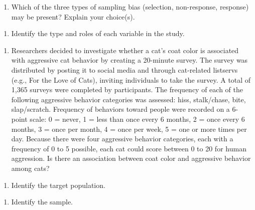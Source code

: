 \documentclass[
]{report}
\providecommand{\tightlist}{%
  \setlength{\itemsep}{0pt}\setlength{\parskip}{0pt}}
\begin{document}
\vspace{0.4in}

\begin{enumerate}
\def\labelenumi{\alph{enumi}.}
\setcounter{enumi}{2}
\tightlist
\item
  Which of the three types of sampling bias (selection, non-response, response) may be present? Explain your choice(s).
\end{enumerate}

\vspace{0.4in}

\begin{enumerate}
\def\labelenumi{\alph{enumi}.}
\setcounter{enumi}{3}
\tightlist
\item
  Identify the type and roles of each variable in the study.
\end{enumerate}

\vspace{0.6in}

\begin{enumerate}
\def\labelenumi{\arabic{enumi}.}
\setcounter{enumi}{3}
\tightlist
\item
  Researchers decided to investigate whether a cat's coat color is associated with aggressive cat behavior by creating a 20-minute survey. The survey was distributed by posting it to social media and through cat-related listservs (e.g., For the Love of Cats), inviting individuals to take the survey. A total of 1,365 surveys were completed by participants. The frequency of each of the following aggressive behavior categories was assessed: hiss, stalk/chase, bite, slap/scratch. Frequency of behaviors toward people were recorded on a 6-point scale: 0 = never, 1 = less than once every 6 months, 2 = once every 6 months, 3 = once per month, 4 = once per week, 5 = one or more times per day. Because there were four aggressive behavior categories, each with a frequency of 0 to 5 possible, each cat could score between 0 to 20 for human aggression. Is there an association between coat color and aggressive behavior among cats?
\end{enumerate}

\begin{enumerate}
\def\labelenumi{\alph{enumi}.}
\tightlist
\item
  Identify the target population.
\end{enumerate}

\vspace{0.4in}

\begin{enumerate}
\def\labelenumi{\alph{enumi}.}
\setcounter{enumi}{1}
\tightlist
\item
  Identify the sample.
\end{enumerate}
\end{document}
